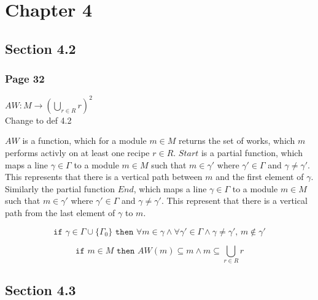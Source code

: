 \chapter*{Chapter 4}

\section*{Section 4.2}

\subsection*{Page 32}
\begin{definition} [H]
$AW: M \rightarrow ({\bigcup_{r\in R}r})^2$ \\ 
\caption{Change to def 4.2}
\label{def:config}
\end{definition}

$AW$ is a function, which for a module $m \in M$ returns the set of works, which $m$ performs activly on at least one recipe $r \in R$. $Start$ is a partial function, which maps a line $\gamma \in \Gamma$ to a module $m \in M$ such that $m \in \gamma'$ where $\gamma' \in \Gamma$ and $\gamma \neq \gamma'$. This represents that there is a vertical path between $m$ and the first element of $\gamma$. Similarly the partial function $End$, which maps a line $\gamma \in \Gamma$ to a module $m \in M$ such that $m \in \gamma'$ where $\gamma' \in \Gamma$ and $\gamma \neq \gamma'$. This represent that there is a vertical path from the last element of $\gamma$ to $m$.  

\[\texttt{if } \gamma \in \Gamma \cup \{\Gamma_0\} \texttt{ then } \forall m \in \gamma \land \forall \gamma ' \in \Gamma \land \gamma \neq \gamma ',\, m \notin \gamma ' \]

\[\texttt{if } m \in M \texttt{ then } AW(m) \subseteq m \land m \subseteq \bigcup_{r\in R}r\] 


\section*{Section 4.3}

